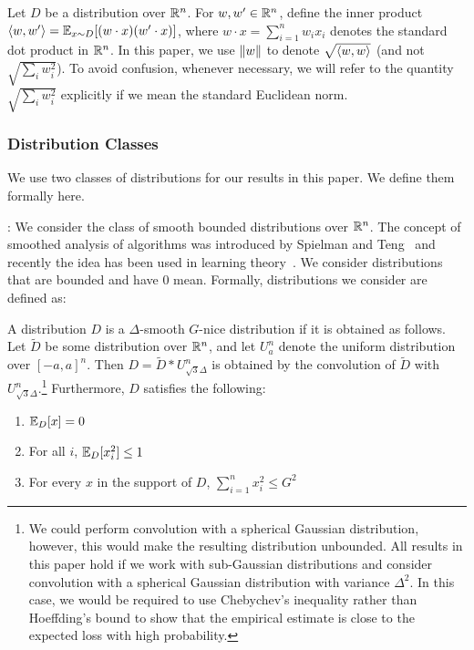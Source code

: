 Let $D$ be a distribution over $\mathbb{R}^n$. For $w, w^\prime \in \mathbb{R}^n$, define the inner
product $\langle w, w^\prime \rangle = \mathbb{E}_{x \sim D}[(w \cdot x) (w^\prime \cdot x)]$,
where $w \cdot x = \sum_{i = 1}^n w_i x_i$ denotes the standard dot product in
$\mathbb{R}^n$. In this paper, we use $\Vert w \Vert$ to denote $\sqrt{\langle w, w \rangle}$
(and not $\sqrt{\sum_{i} w_i^2}$). To avoid confusion, whenever necessary, we
will refer to the quantity $\sqrt{\sum_{i} w_i^2}$ explicitly if we mean the
standard Euclidean norm. 
%
%

\subsubsection*{Distribution Classes}

We use two classes of distributions for our results in this paper. We define
them formally here. \medskip 

: We consider the class of smooth
bounded distributions over $\mathbb{R}^n$. The concept of smoothed analysis of
algorithms was introduced by Spielman and Teng~\cite{ST:2004} and recently the
idea has been used in learning theory~\cite{KST:2009,KKM:2013}. We consider
distributions that are bounded and have $0$ mean. Formally,
distributions we consider are defined as:

\begin{definition}
\label{defn:afghanistan} A distribution $D$ is a $\Delta$-smooth $G$-nice
distribution if it is obtained as follows. Let $\tilde{D}$ be some distribution
over $\mathbb{R}^n$, and let $U^n_a$ denote the uniform distribution over $[-a,
a]^n$. Then $D = \tilde{D} * U^n_{\sqrt{3}\Delta}$ is obtained by the convolution of
$\tilde{D}$ with $U^n_{\sqrt{3} \Delta}$.\footnote{We could perform convolution
with a spherical Gaussian distribution, however, this would make the resulting
distribution unbounded. All results in this paper hold if we work with
sub-Gaussian distributions and consider convolution with a spherical Gaussian
distribution with variance $\Delta^2$.  In this case, we would be required to use
Chebychev's inequality rather than Hoeffding's bound to show that the empirical
estimate is close to the expected loss with high probability.} Furthermore, $D$
satisfies the following:
\begin{enumerate}
\item $\mathbb{E}_D[x] = 0$
\item For all $i$, $\mathbb{E}_D[x_i^2] \leq 1$
\item For every $x$ in the support of $D$, $\sum_{i = 1}^n x_i^2 \leq G^2$
\end{enumerate}
\end{definition}

